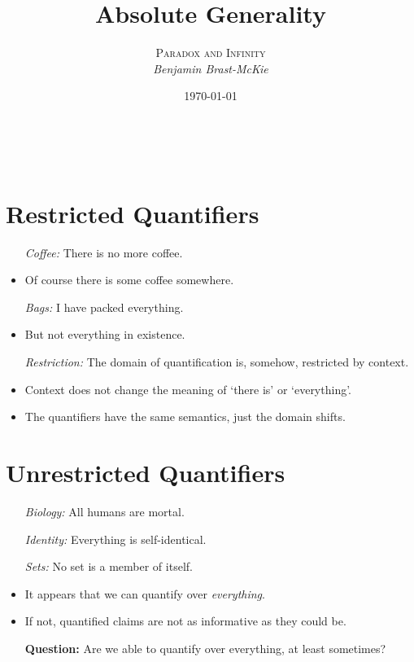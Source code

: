\documentclass[a4paper, 11pt]{article} %
\title{\textbf{Absolute Generality}} %
\author{\textsc{Paradox and Infinity}\\ \em Benjamin Brast-McKie} %
\date{\today} %
\makeatletter
\renewcommand{\maketitle}{ %
\begin{flushright} %
{\LARGE\@title} %

\vspace{10pt} %

{\@author} %
\\\@date %

\vspace{00pt} %
\end{flushright}
}
\makeatother
\begin{document}
\maketitle %

\thispagestyle{empty}


\section*{Restricted Quantifiers}

\begin{itemize}
  \item[\it Coffee:] There is no more coffee.
    \item Of course there is some coffee somewhere.
  \item[\it Bags:] I have packed everything.
    \item But not everything in existence.
  \item[\it Restriction:] The domain of quantification is, somehow, restricted by context.
    \item Context does not change the meaning of `there is' or `everything'.
    \item The quantifiers have the same semantics, just the domain shifts.
\end{itemize}





\section*{Unrestricted Quantifiers}

\begin{itemize}
  \item[\it Biology:] All humans are mortal.
  \item[\it Identity:] Everything is self-identical.
  \item[\it Sets:] No set is a member of itself.
    \item It appears that we can quantify over \textit{everything}.
    \item If not, quantified claims are not as informative as they could be.
  \item[\bf Question:] Are we able to quantify over everything, at least sometimes?
\end{itemize}
\end{document}
